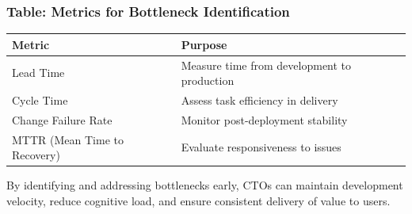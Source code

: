 \subsubsection*{Table: Metrics for Bottleneck Identification}
\begin{tabular}{|l|l|}
    \hline
    \textbf{Metric}              & \textbf{Purpose}                            \\
    \hline
    Lead Time                    & Measure time from development to production \\
    \hline
    Cycle Time                   & Assess task efficiency in delivery          \\
    \hline
    Change Failure Rate          & Monitor post-deployment stability           \\
    \hline
    MTTR (Mean Time to Recovery) & Evaluate responsiveness to issues           \\
    \hline
\end{tabular}


By identifying and addressing bottlenecks early, CTOs can maintain development velocity, reduce cognitive load, and ensure consistent delivery of value to users.
